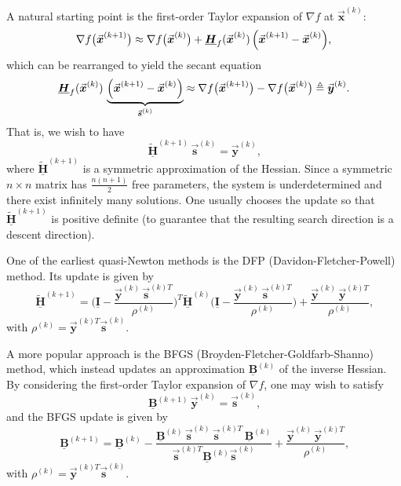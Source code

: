 \documentclass[9pt, headings=standardclasses, parskip=half]{scrartcl}
\renewcommand{\emph}[1]{\textcolor{mypurple}{#1}}
\newcommand{\matr}[1]{\underline{\boldsymbol{#1}}}
\newcommand{\vect}[1]{\vec{\boldsymbol{#1}}}
\begin{document}
A natural starting point is the first-order Taylor expansion of \(\nabla f\) at \(\vect{x}^{(k)}\):
\[
\nabla f\bigl(\vect{x}^{(k+1)}\bigr) \approx \nabla f\bigl(\vect{x}^{(k)}\bigr) + \matr{H}_{f}(\vect{x}^{(k)})\,\Bigl(\vect{x}^{(k+1)} - \vect{x}^{(k)}\Bigr) \text{,}
\]
which can be rearranged to yield the \emph{secant equation}
\[
\matr{H}_{f}(\vect{x}^{(k)})\, \underbrace{\Bigl(\vect{x}^{(k+1)} - \vect{x}^{(k)}\Bigr)}_{\vect{s}^{(k)}} \approx \nabla f\bigl(\vect{x}^{(k+1)}\bigr) - \nabla f\bigl(\vect{x}^{(k)}\bigr) \triangleq \vect{y}^{(k)} \text{.}
\]
That is, we wish to have
\[
\tilde{\matr{H}}^{(k+1)}\, \vect{s}^{(k)} = \vect{y}^{(k)} \text{,}
\]
where \(\tilde{\matr{H}}^{(k+1)}\) is a symmetric approximation of the Hessian. Since a symmetric \(n \times n\) matrix has \(\frac{n(n+1)}{2}\) free parameters, the system is underdetermined and there exist infinitely many solutions. One usually chooses the update so that \(\tilde{\matr{H}}^{(k+1)}\) is positive definite (to guarantee that the resulting search direction is a descent direction).

One of the earliest quasi-Newton methods is the DFP (Davidon-Fletcher-Powell) method. Its update is given by
\[
\tilde{\matr{H}}^{(k+1)} = \Biggl(\matr{I} - \frac{\vect{y}^{(k)}\, \vect{s}^{(k)T}}{\rho^{(k)}}\Biggr)^T \tilde{\matr{H}}^{(k)} \Biggl(\matr{I} - \frac{\vect{y}^{(k)}\, \vect{s}^{(k)T}}{\rho^{(k)}}\Biggr) + \frac{\vect{y}^{(k)}\,\vect{y}^{(k)T}}{\rho^{(k)}} \text{,}
\]
with
\(
\rho^{(k)} = \vect{y}^{(k)T} \vect{s}^{(k)} \text{.}
\)

A more popular approach is the BFGS (Broyden-Fletcher-Goldfarb-Shanno) method, which instead updates an approximation \(\matr{B}^{(k)}\) of the inverse Hessian. By considering the first-order Taylor expansion of \(\nabla f\), one may wish to satisfy
\[
\matr{B}^{(k+1)}\, \vect{y}^{(k)} = \vect{s}^{(k)} \text{,}
\]
and the BFGS update is given by
\[
\matr{B}^{(k+1)} = \matr{B}^{(k)} - \frac{\matr{B}^{(k)}\, \vect{s}^{(k)}\, \vect{s}^{(k)T}\, \matr{B}^{(k)}}{\vect{s}^{(k)T}\matr{B}^{(k)}\vect{s}^{(k)}} + \frac{\vect{y}^{(k)}\, \vect{y}^{(k)T}}{\rho^{(k)}} \text{,}
\]
with
\(
\rho^{(k)} = \vect{y}^{(k)T} \vect{s}^{(k)} \text{.}
\)
\end{document}
